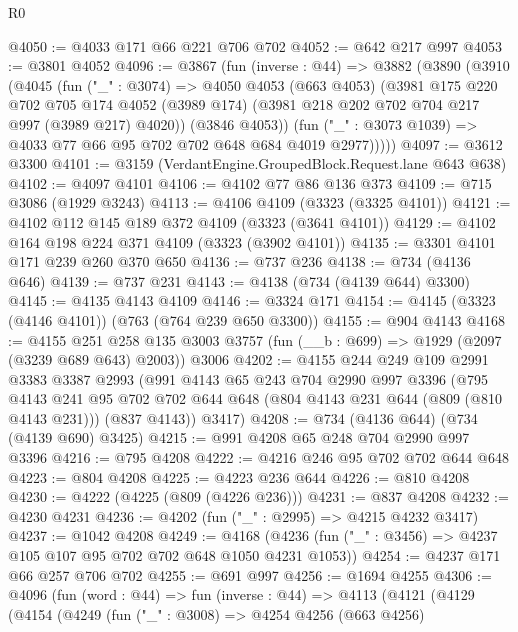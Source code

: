 \begin{lexlean}{R0}
\begin{coremodule}
@4050 := @4033 @171 @66 @221 @706 @702
@4052 := @642 @217 @997
@4053 := @3801 @4052
@4096 := @3867
    (fun (inverse : @44) =>
    @3882
      (@3890
        (@3910
          (@4045
            (fun ("_" : @3074) =>
            @4050
              @4053
              (@663 @4053)
              (@3981
                @175
                @220
                @702
                @705
                @174
                @4052
                (@3989 @174)
                (@3981 @218 @202 @702 @704 @217 @997 (@3989 @217) @4020))
              (@3846 @4053))
            (fun ("_" : @3073 @1039) => @4033 @77 @66 @95 @702 @702 @648 @684 @4019 @2977)))))
@4097 := @3612 @3300
@4101 := @3159 (VerdantEngine.GroupedBlock.Request.lane @643 @638)
@4102 := @4097 @4101
@4106 := @4102 @77 @86 @136 @373
@4109 := @715 @3086 (@1929 @3243)
@4113 := @4106 @4109 (@3323 (@3325 @4101))
@4121 := @4102 @112 @145 @189 @372 @4109 (@3323 (@3641 @4101))
@4129 := @4102 @164 @198 @224 @371 @4109 (@3323 (@3902 @4101))
@4135 := @3301 @4101 @171 @239 @260 @370 @650
@4136 := @737 @236
@4138 := @734 (@4136 @646)
@4139 := @737 @231
@4143 := @4138 (@734 (@4139 @644) @3300)
@4145 := @4135 @4143 @4109
@4146 := @3324 @171
@4154 := @4145 (@3323 (@4146 @4101)) (@763 (@764 @239 @650 @3300))
@4155 := @904 @4143
@4168 := @4155
    @251
    @258
    @135
    @3003
    @3757
    (fun (__b : @699) => @1929 (@2097 (@3239 @689 @643) @2003))
    @3006
@4202 := @4155
    @244
    @249
    @109
    @2991
    @3383
    @3387
    @2993
    (@991
      @4143
      @65
      @243
      @704
      @2990
      @997
      @3396
      (@795
        @4143
        @241
        @95
        @702
        @702
        @644
        @648
        (@804 @4143 @231 @644 (@809 (@810 @4143 @231)))
        (@837 @4143))
      @3417)
@4208 := @734 (@4136 @644) (@734 (@4139 @690) @3425)
@4215 := @991 @4208 @65 @248 @704 @2990 @997 @3396
@4216 := @795 @4208
@4222 := @4216 @246 @95 @702 @702 @644 @648
@4223 := @804 @4208
@4225 := @4223 @236 @644
@4226 := @810 @4208
@4230 := @4222 (@4225 (@809 (@4226 @236)))
@4231 := @837 @4208
@4232 := @4230 @4231
@4236 := @4202 (fun ("_" : @2995) => @4215 @4232 @3417)
@4237 := @1042 @4208
@4249 := @4168 (@4236 (fun ("_" : @3456) => @4237 @105 @107 @95 @702 @702 @648 @1050 @4231 @1053))
@4254 := @4237 @171 @66 @257 @706 @702
@4255 := @691 @997
@4256 := @1694 @4255
@4306 := @4096
    (fun (word : @44) =>
    fun (inverse : @44) =>
    @4113
      (@4121
        (@4129
          (@4154
            (@4249
              (fun ("_" : @3008) =>
              @4254
                @4256
                (@663 @4256)

\end{coremodule}
\end{lexlean}
